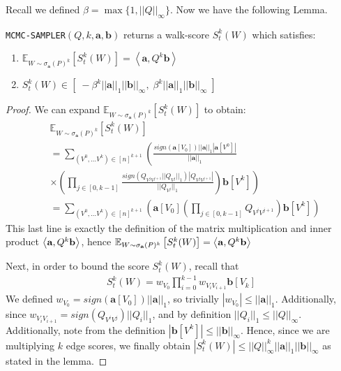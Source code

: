 
Recall we defined $\beta = \max\{1,||Q||_{\infty}\}$. 
Now we have the following Lemma.
\begin{lemma}
\texttt{MCMC-SAMPLER}$(Q, k,\mathbf{a},\mathbf{b})$ returns a walk-score $S_{t}^k(W)$ which satisfies:
\begin{enumerate}
\item $\mathbb{E}_{W \sim \sigma_{\mathbf{a}}(P)^k} \left[S_{t}^k(W)\right] = \left<\mathbf{a}, Q^k\mathbf{b} \right>$
\item $S_{t}^{k}(W) \in [\;-\beta^k||\mathbf{a}||_1||\mathbf{b}||_{\infty} ,\; \beta^k||\mathbf{a}||_1||\mathbf{b}||_{\infty} \;]$
\end{enumerate}
\end{lemma}


\begin{proof}
We can expand $\mathbb{E}_{W \sim \sigma_{\mathbf{a}}(P)^k} \left[S_{t}^k(W)\right]$ to obtain:
\small
\begin{align*}
&\mathbb{E}_{W \sim \sigma_{\mathbf{a}}(P)^k} \left[S_{t}^k(W)\right] \\ 
&= \sum_{(V^0, ... V^{k}) \in [n]^{k+1}} \left(\frac{sign(\mathbf{a}[V_0])||\mathbf{a}||_1|\mathbf{a}[V^0]|}{||\mathbf{a}||_1} \right. \\
&\left. \times \left( \prod_{j \in [0, k-1]} \frac{sign(Q_{V^jV^{j+1}}||Q_{V^j}||_1)|Q_{V^jV^{j+1}}|}{||Q_{V^j}||_1} \right) \mathbf{b}[V^k] \right) \\
& = \sum_{(V^0, ... V^{k}) \in [n]^{k+1}} \left(\mathbf{a}[V_0] \left( \prod_{j \in [0, k-1]} Q_{V^jV^{j+1}}\right) \mathbf{b}[V^k] \right)
\end{align*}
\normalsize
This last line is exactly the definition of the matrix multiplication and inner product $\left< \mathbf{a}, Q^k\mathbf{b} \right>$, hence $\mathbb{E}_{W \sim \sigma_{\mathbf{a}}(P)^k} \left[S_{t}^k(W)\right] = \left< \mathbf{a}, Q^k\mathbf{b} \right>$


Next, in order to bound the score $S_{t}^k(W)$, recall that
\begin{align*}
S_{t}^k(W) = w_{V_0}\prod_{i=0}^{k-1}w_{V_iV_{i+1}}\mathbf{b}[V_{k}]
\end{align*}
We defined $w_{V_0} = sign(\mathbf{a}[V_0])||\mathbf{a}||_1$, so trivially $|w_{V_0}| \leq ||\mathbf{a}||_1$.
Additionally, since $w_{V_iV_{i+1}} = sign(Q_{V^iV^j})||Q_i||_1 $, and by definition $||Q_i||_1  \leq ||Q||_{\infty}$. Additionally, note from the definition $| \mathbf{b}[V^k] |\leq ||\mathbf{b}||_\infty$.
Hence, since we are multiplying $k$ edge scores, we finally obtain
$|S_{t}^k(W)| \leq ||Q||_{\infty}^k||\mathbf{a}||_1||\mathbf{b}||_\infty$ as stated in the lemma.
\end{proof}

